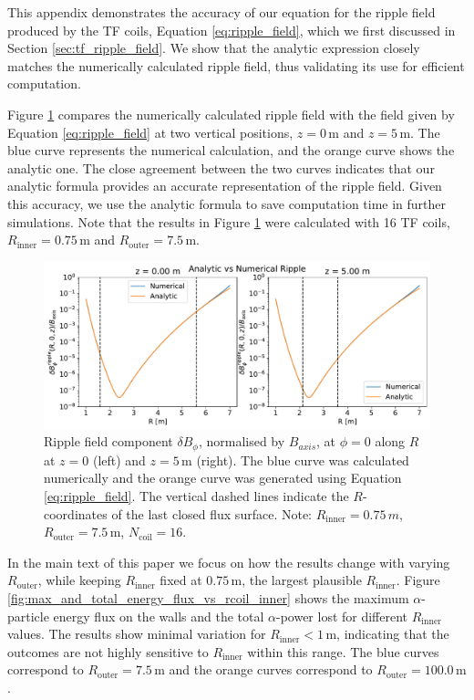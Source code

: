 \documentclass[10pt, a4paper, twoside]{article}
\begin{document}
This appendix demonstrates the accuracy of our equation for the ripple field produced by the TF coils, Equation \eqref{eq:ripple_field}, which we first discussed in Section \ref{sec:tf_ripple_field}. We show that the analytic expression closely matches the numerically calculated ripple field, thus validating its use for efficient computation.

Figure \ref{fig:ripple_check} compares the numerically calculated ripple field with the field given by Equation \eqref{eq:ripple_field} at two vertical positions, \( z = 0 \, \text{m} \) and \( z = 5 \, \text{m} \). The blue curve represents the numerical calculation, and the orange curve shows the analytic one. The close agreement between the two curves indicates that our analytic formula provides an accurate representation of the ripple field. Given this accuracy, we use the analytic formula to save computation time in further simulations. Note that the results in Figure \ref{fig:ripple_check} were calculated with 16 TF coils, \( R_{\text{inner}} = 0.75\, \text{m} \) and \( R_{\text{outer}} = 7.5\, \text{m} \).

\begin{figure}[h!]
    \centering
    \includegraphics[width=0.99\linewidth]{Figures/ripple_check.pdf}
    \caption{Ripple field component \( \delta B_\phi \), normalised by \( B_{axis} \), at \( \phi = 0 \) along \( R \) at \( z = 0 \) (left) and \( z = 5\, \text{m} \) (right). The blue curve was calculated numerically and the orange curve was generated using Equation \eqref{eq:ripple_field}. The vertical dashed lines indicate the \( R \)-coordinates of the last closed flux surface. Note: \(R_\text{inner} = 0.75\, \si{m}\), \( R_{\text{outer}} = 7.5\, \text{m} \), \( N_{\text{coil}} = 16 \).}
    \label{fig:ripple_check}
\end{figure}

In the main text of this paper we focus on how the results change with varying \( R_\text{outer} \), while keeping \( R_\text{inner} \) fixed at \( 0.75\,\text{m} \), the largest plausible \( R_\text{inner} \). Figure \ref{fig:max_and_total_energy_flux_vs_rcoil_inner} shows the maximum $\alpha$-particle energy flux on the walls and the total $\alpha$-power lost for different \( R_\text{inner} \) values. The results show minimal variation for \( R_\text{inner} < 1\,\text{m} \), indicating that the outcomes are not highly sensitive to \( R_\text{inner} \) within this range. The blue curves correspond to \( R_\text{outer} = 7.5\,\text{m} \) and the orange curves correspond to \( R_\text{outer} = 100.0\,\text{m} \).
\end{document}
